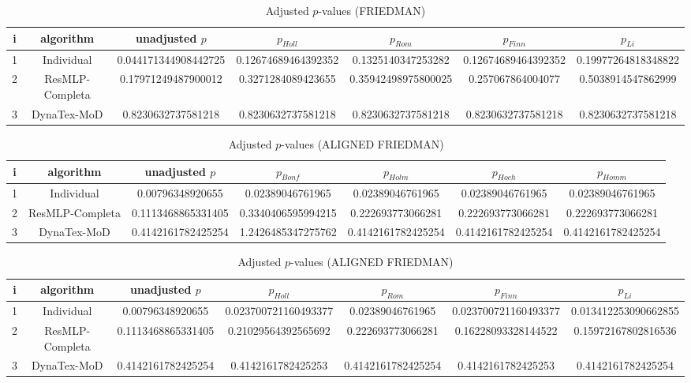 \documentclass[a4paper,10pt]{article}
\begin{document}
\begin{landscape}
\begin{table}[!htp]
\centering\scriptsize
\caption{Adjusted $p$-values (FRIEDMAN)}
\begin{tabular}{ccccccc}
i&algorithm&unadjusted $p$&$p_{Holl}$&$p_{Rom}$&$p_{Finn}$&$p_{Li}$\\
\hline
1&Individual&0.044171344908442725&0.12674689464392352&0.1325140347253282&0.12674689464392352&0.19977264818348822\\
2&ResMLP-Completa&0.17971249487900012&0.3271284089423655&0.35942498975800025&0.257067864004077&0.5038914547862999\\
3&DynaTex-MoD&0.8230632737581218&0.8230632737581218&0.8230632737581218&0.8230632737581218&0.8230632737581218\\
\hline
\end{tabular}
\end{table}


\newpage

\begin{table}[!htp]
\centering\scriptsize
\caption{Adjusted $p$-values (ALIGNED FRIEDMAN)}
\begin{tabular}{ccccccc}
i&algorithm&unadjusted $p$&$p_{Bonf}$&$p_{Holm}$&$p_{Hoch}$&$p_{Homm}$\\
\hline
1&Individual&0.00796348920655&0.02389046761965&0.02389046761965&0.02389046761965&0.02389046761965\\
2&ResMLP-Completa&0.1113468865331405&0.3340406595994215&0.222693773066281&0.222693773066281&0.222693773066281\\
3&DynaTex-MoD&0.4142161782425254&1.2426485347275762&0.4142161782425254&0.4142161782425254&0.4142161782425254\\
\hline
\end{tabular}
\end{table}

\begin{table}[!htp]
\centering\scriptsize
\caption{Adjusted $p$-values (ALIGNED FRIEDMAN)}
\begin{tabular}{ccccccc}
i&algorithm&unadjusted $p$&$p_{Holl}$&$p_{Rom}$&$p_{Finn}$&$p_{Li}$\\
\hline
1&Individual&0.00796348920655&0.023700721160493377&0.02389046761965&0.023700721160493377&0.013412253090662855\\
2&ResMLP-Completa&0.1113468865331405&0.21029564392565692&0.222693773066281&0.16228093328144522&0.15972167802816536\\
3&DynaTex-MoD&0.4142161782425254&0.4142161782425253&0.4142161782425254&0.4142161782425253&0.4142161782425254\\
\hline
\end{tabular}
\end{table}



\end{landscape}
\end{document}
